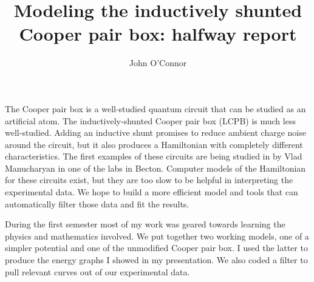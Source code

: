 \documentclass[12pt]{article}
\title{Modeling the inductively shunted\\Cooper pair box: halfway report}
\author{John O'Connor}
\date{}
\begin{document}
\maketitle

The Cooper pair box is a well-studied quantum circuit that can be
studied as an artificial atom. The inductively-shunted Cooper pair box
(LCPB) is much less well-studied. Adding an inductive shunt promises to
reduce ambient charge noise around the circuit, but it also produces a
Hamiltonian with completely different characteristics. The first
examples of these circuits are being studied in by Vlad Manucharyan in
one of the labs in Becton. Computer models of the Hamiltonian for
these circuits exist, but they are too slow to be helpful in
interpreting the experimental data. We hope to build a more efficient
model and tools that can automatically filter those data and fit the
results.

During the first semester most of my work was geared towards learning
the physics and mathematics involved. We put together two working
models, one of a simpler potential and one of the unmodified Cooper
pair box. I used the latter to produce the energy graphs I showed in my
presentation. We also coded a filter to pull relevant curves out of
our experimental data.
\end{document}
